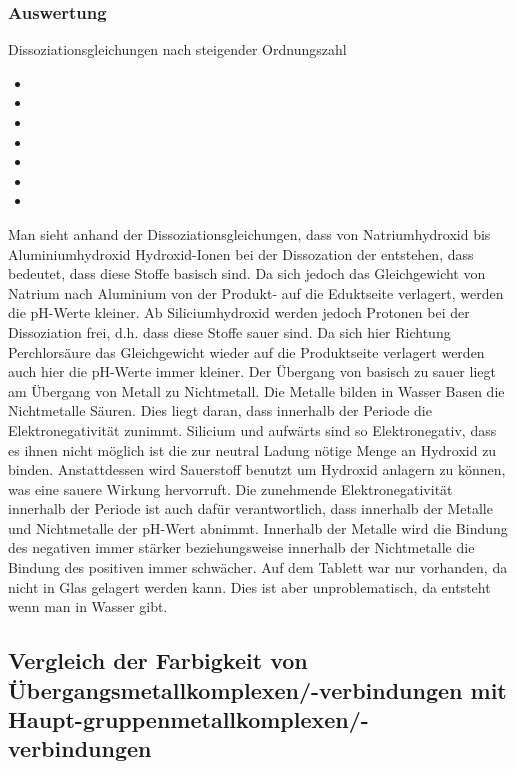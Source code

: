 \documentclass{scrartcl}
\begin{document}
\subsubsection{Auswertung}
Dissoziationsgleichungen nach steigender Ordnungszahl
\begin{itemize}
	\item{}
	\item{}
	\item{}
	\item{}
	\item{}
	\item{}
	\item{}
\end{itemize}
Man sieht anhand der Dissoziationsgleichungen, dass von Natriumhydroxid bis Aluminiumhydroxid Hydroxid-Ionen bei der Dissozation der entstehen, dass bedeutet, dass diese Stoffe basisch sind. Da sich jedoch das Gleichgewicht von Natrium nach Aluminium von der Produkt- auf die Eduktseite verlagert, werden die pH-Werte kleiner.
Ab Siliciumhydroxid werden jedoch Protonen bei der Dissoziation frei, d.h. dass diese Stoffe sauer sind. Da sich hier Richtung Perchlorsäure das Gleichgewicht wieder auf die Produktseite verlagert werden auch hier die pH-Werte immer kleiner.
Der Übergang von basisch zu sauer liegt am Übergang von Metall zu Nichtmetall. Die Metalle bilden in Wasser Basen die Nichtmetalle Säuren. Dies liegt daran, dass innerhalb der Periode die Elektronegativität zunimmt. Silicium und aufwärts sind so Elektronegativ, dass es ihnen nicht möglich ist die zur neutral Ladung nötige Menge an Hydroxid zu binden. Anstattdessen wird Sauerstoff benutzt um Hydroxid anlagern zu können, was eine sauere Wirkung hervorruft.
Die zunehmende Elektronegativität innerhalb der Periode ist auch dafür verantwortlich, dass innerhalb der Metalle und Nichtmetalle der pH-Wert abnimmt. Innerhalb der Metalle wird die Bindung des negativen  immer stärker beziehungsweise innerhalb der Nichtmetalle die Bindung des positiven immer schwächer.
Auf dem Tablett war nur  vorhanden, da  nicht in Glas gelagert werden kann. Dies ist aber unproblematisch, da  entsteht wenn man  in Wasser gibt.

\subsection{Vergleich der Farbigkeit von Übergangsmetallkomplexen/-verbindungen mit Haupt-gruppenmetallkomplexen/-verbindungen}
\end{document}
